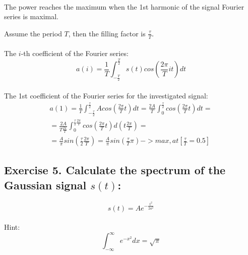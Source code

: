 \documentclass[14pt]{article}
\begin{document}
\paragraph{}
The power reaches the maximum when the 1st harmonic of the signal 
	Fourier series is maximal.

Assume the period $ T $, then the filling factor is 
	$ \frac{\tau}{T} $.

\paragraph{}
The $ i $-th coefficient of the Fourier series:
\begin{equation}
	a(i)
	=
	\frac{1}{T} \int_{-\frac{T}{2}}^{\frac{T}{2}} s(t) 
		cos(\frac{2 \pi}{T} i t) {d}t
\end{equation}

\paragraph{}
The 1st coefficient of the Fourier series for the investigated
	signal:
\begin{multline}
	a(1)
	=
	\frac{1}{T} \int_{-\frac{\tau}{2}}^{\frac{\tau}{2}} A
		cos(\frac{2 \pi}{T} t) {d}t
	=
	\frac{2 A}{T} \int_{0}^{\frac{\tau}{2}} 
		cos(\frac{2 \pi}{T} t) {d}t
	=\\=
	\frac{2 A}{T \frac{2 \pi}{T}} \int_0^{\frac{\tau}{2} 
		\frac{2 \pi}{T}} cos(\frac{2 \pi}{T} t) 
		{d}(t \frac{2 \pi}{T}) 
	=\\=
	\frac{A}{\pi} sin(\frac{\tau}{2} \frac{2 \pi}{T})
	=
	\frac{A}{\pi} sin(\frac{\tau}{T} \pi) 
	-> max, at [\frac{\tau}{T} = 0.5]
\end{multline}

\subsection{Exercise 5. Calculate the spectrum of the Gaussian
	signal $ s(t) $:}
\begin{equation}
	s(t)
	=
	A e^{-\frac{t^2}{2 a^2}} 
\end{equation}

\paragraph{}
Hint: 
\begin{equation} \label{Root Pi}
	\int_{-\infty}^{\infty} e^{-x^2} {d}x
	=
	\sqrt{\pi}
\end{equation}
\end{document}

